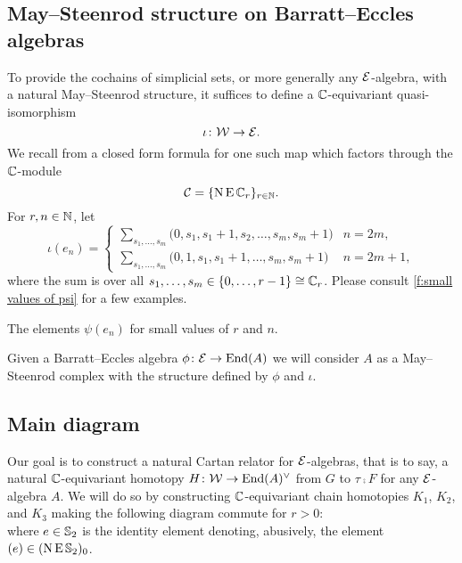 \subsection{May--Steenrod structure on Barratt--Eccles algebras}\label{ss:may-steenrod on barratt-eccles}

To provide the cochains of simplicial sets, or more generally any $\mathcal{E}$-algebra, with a natural May--Steenrod structure, it suffices to define a $\mathbb{C}$-equivariant quasi-isomorphism
\[
\iota \colon \mathcal{W} \to \mathcal{E}.
\]
We recall from \cite{medina2021may_st} a closed form formula for one such map which factors through the $\mathbb{C}$-module
\[
\mathcal{C} = \{\operatorname{N}\operatorname{E}\mathbb{C}_r\}_{r\in\mathbb{N}}.
\]
For $r,n\in\mathbb{N}$, let
\begin{equation*}
	\iota(e_{n}) =
	\begin{cases}
		\displaystyle{\sum_{s_1, \dots, s_m}} \big(0, {s_1}, {s_1+1}, {s_2}, \dots, {s_{m}}, {s_{m}+1} \big) & n = 2m, \\
		\displaystyle{\sum_{s_1, \dots, s_m}} \big(0, 1, {s_1}, {s_1+1}, \dots, {s_{m}}, {s_{m}+1} \big) & n = 2m+1,
	\end{cases}
\end{equation*}
where the sum is over all $s_1, \dots, s_m \in \{0, \dots, r-1\} \cong \mathbb{C}_r$.
Please consult \cref{f:small values of psi} for a few examples.

\begin{table}
	\centering
	
	\caption{The elements $\psi(e_n)$ for small values of $r$ and $n$.}
	\label{f:small values of psi}
\end{table}

Given a Barratt--Eccles algebra $\phi \colon \mathcal{E} \to \mathrm{End}(A)$ we will consider $A$ as a May--Steenrod complex with the structure defined by $\phi$ and $\iota$.

\subsection{Main diagram}

Our goal is to construct a natural Cartan relator for $\mathcal{E}$-algebras, that is to say, a natural $\mathbb{C}$-equivariant homotopy $H \colon \mathcal{W} \to \mathrm{End}(A)^\vee$ from $G$ to $\tau \comp F$ for any $\mathcal{E}$-algebra $A$.
We will do so by constructing $\mathbb{C}$-equivariant chain homotopies $K_1$, $K_2$, and $K_3$ making the following diagram commute for $r > 0$:
\begin{equation}\label{d:big diagram}
	
\end{equation}
where $e \in \mathbb{S}_2$ is the identity element denoting, abusively, the element $(e) \in (\operatorname{N}\operatorname{E}\mathbb{S}_2)_0$.

